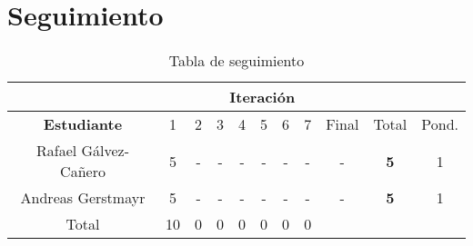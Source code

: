 \section{Seguimiento}

\begin{table}[htdp]
\begin{center}
\begin{tabular}{|c|c|c|c|c|c|c|c|c|c|c|}
\cline{2-9}
\multicolumn{1}{c}{}&\multicolumn{8}{|c|}{\textbf{Iteración}}&\multicolumn{2}{c}{}\\
\hline
\textbf{Estudiante}&1&2&3&4&5&6&7&Final&Total&Pond.\\
\hline
Rafael Gálvez-Cañero&5&-&-&-&-&-&-&-&\textbf{5}&1\\
Andreas Gerstmayr   &5&-&-&-&-&-&-&-&\textbf{5}&1\\
\hline
Total               &10&0&0&0&0&0&0&\multicolumn{2}{c}{}\\
\cline{1-8}
\end{tabular}
\end{center}
\caption{Tabla de seguimiento}
\label{tab:seguimiento}
\end{table}%
